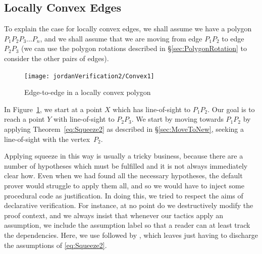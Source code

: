 \subsection{Locally Convex Edges}\label{sec:ConcaveMove}
To explain the case for locally convex edges, we shall assume we have a polygon $P_1P_2P_3\ldots P_n$, and we shall assume that we are moving from edge $P_1P_2$ to edge $P_2P_3$ (we can use the polygon rotations described in \S\ref{sec:PolygonRotation} to consider the other pairs of edges).

\begin{figure}
\centering\texttt{[image: jordanVerification2/Convex1]}
\caption{Edge-to-edge in a locally convex polygon}
\label{fig:Convex1}
\end{figure}

In Figure~\ref{fig:Convex1}, we start at a point $X$ which has line-of-sight to $P_1P_2$. Our goal is to reach a point $Y$ with line-of-sight to $P_2P_3$. We start by moving towards $P_1P_2$ by applying Theorem~\ref{eq:Squeeze2} as described in \S\ref{sec:MoveToNew}, seeking a line-of-sight with the vertex~$P_2$. 

\label{sec:InjectingProcedural}Applying squeeze in this way is usually a tricky business, because there are a number of hypotheses which must be fulfilled and it is not always immediately clear how. Even when we had found all the necessary hypotheses, the default  prover would struggle to apply them all, and so we would have to inject some procedural code as justification. In doing this, we tried to respect the aims of declarative verification. For instance, at no point do we destructively modify the proof context, and we always insist that whenever our tactics apply an assumption, we include the assumption label so that a reader can at least track the dependencies. Here, we use  followed by , which leaves  just having to discharge the assumptions of \eqref{eq:Squeeze2}.


